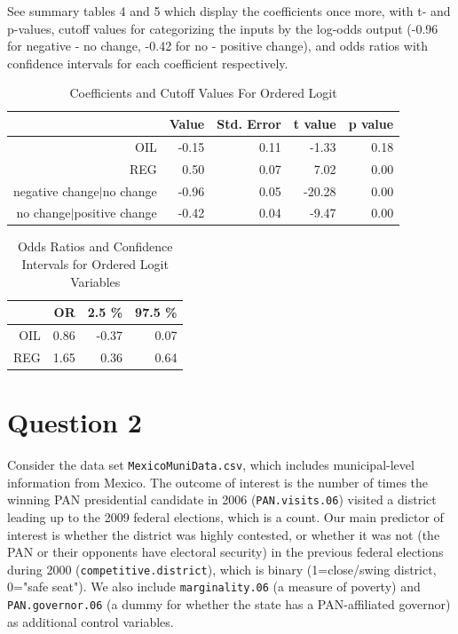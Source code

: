 \documentclass[12pt,letterpaper]{article}
\begin{document}
\begin{enumerate}
	See summary tables 4 and 5 which display the coefficients once more, with t- and p-values, cutoff values for categorizing the inputs by the log-odds output (-0.96 for negative - no change, -0.42 for no - positive change), and odds ratios with confidence intervals for each coefficient respectively.\\
	
				
	
	\begin{table}[ht]
		\caption{Coefficients and Cutoff Values For Ordered Logit} 
		\centering
		\begin{tabular}{rrrrr}
			\hline
			& Value & Std. Error & t value & p value \\ 
			\hline
			OIL & -0.15 & 0.11 & -1.33 & 0.18 \\ 
			REG & 0.50 & 0.07 & 7.02 & 0.00 \\ 
			\hline
			negative change$|$no change & -0.96 & 0.05 & -20.28 & 0.00 \\ 
			no change$|$positive change & -0.42 & 0.04 & -9.47 & 0.00 \\ 
			\hline
		\end{tabular}
	\end{table}
	
	\newpage
	
	\begin{table}[ht]
		\centering
		\caption{Odds Ratios and Confidence Intervals for Ordered Logit Variables}
		\begin{tabular}{rrrr}
			\hline
			& OR & 2.5 \% & 97.5 \% \\ 
			\hline
			OIL & 0.86 & -0.37 & 0.07 \\ 
			REG & 1.65 & 0.36 & 0.64 \\ 
			\hline
		\end{tabular}
	\end{table}
	
	
\end{enumerate}

\newpage

\section*{Question 2} 
\vspace{.25cm}

\noindent Consider the data set \texttt{MexicoMuniData.csv}, which includes municipal-level information from Mexico. The outcome of interest is the number of times the winning PAN presidential candidate in 2006 (\texttt{PAN.visits.06}) visited a district leading up to the 2009 federal elections, which is a count. Our main predictor of interest is whether the district was highly contested, or whether it was not (the PAN or their opponents have electoral security) in the previous federal elections during 2000 (\texttt{competitive.district}), which is binary (1=close/swing district, 0="safe seat"). We also include \texttt{marginality.06} (a measure of poverty) and \texttt{PAN.governor.06} (a dummy for whether the state has a PAN-affiliated governor) as additional control variables. 
\end{document}
